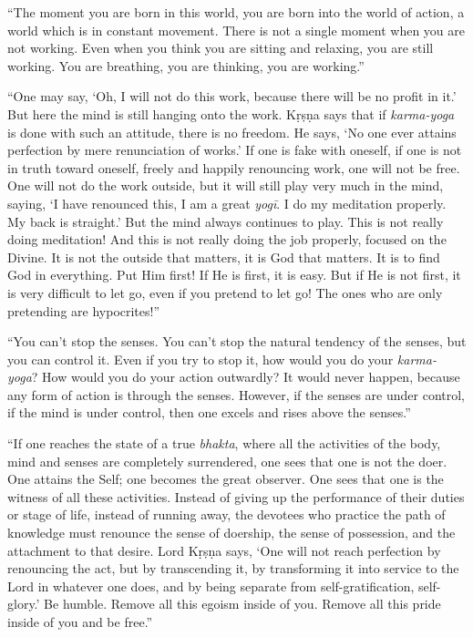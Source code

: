 \enquote{The moment you are born in this world, you are born into the world of action, a world which is in constant movement. There is not a single moment when you are not working. Even when you think you are sitting and relaxing, you are still working. You are breathing, you are thinking, you are working.}

\enquote{One may say, \enquote{Oh, I will not do this work, because there will be no profit in it.} But here the mind is still hanging onto the work. Kṛṣṇa says that if \textit{karma-yoga} is done with such an attitude, there is no freedom. He says, \enquote{No one ever attains perfection by mere renunciation of works.} If one is fake with oneself, if one is not in truth toward oneself, freely and happily renouncing work, one will not be free. One will not do the work outside, but it will still play very much in the mind, saying, \enquote{I have renounced this, I am a great \textit{yogī}. I do my meditation properly. My back is straight.} But the mind always continues to play. This is not really doing meditation! And this is not really doing the job properly, focused on the Divine. It is not the outside that matters, it is God that matters. It is to find God in everything. Put Him first! If He is first, it is easy. But if He is not first, it is very difficult to let go, even if you pretend to let go! The ones who are only pretending are hypocrites!}

\enquote{You can’t stop the senses. You can’t stop the natural tendency of the senses, but you can control it. Even if you try to stop it, how would you do your \textit{karma-yoga}? How would you do your action outwardly? It would never happen, because any form of action is through the senses. However, if the senses are under control, if the mind is under control, then one excels and rises above the senses.}

\enquote{If one reaches the state of a true \textit{bhakta}, where all the activities of the body, mind and senses are completely surrendered, one sees that one is not the doer. One attains the Self; one becomes the great observer. One sees that one is the witness of all these activities. Instead of giving up the performance of their duties or stage of life, instead of running away, the devotees who practice the path of knowledge must renounce the sense of doership, the sense of possession, and the attachment to that desire. Lord Kṛṣṇa says, \enquote{One will not reach perfection by renouncing the act, but by transcending it, by transforming it into service to the Lord in whatever one does, and by being separate from self-gratification, self-glory.} Be humble. Remove all this egoism inside of you. Remove all this pride inside of you and be free.}

